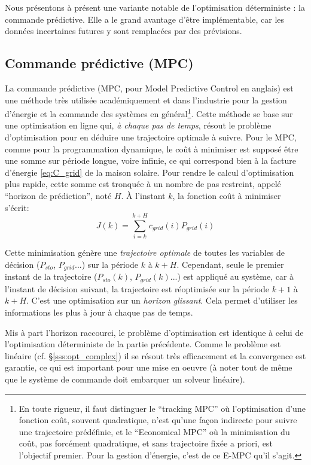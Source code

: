 \documentclass[a4paper,10pt,twocolumn]{article}
\begin{document}
Nous présentons à présent une variante notable de l'optimisation déterministe : la commande prédictive.
Elle a le grand avantage d'être implémentable, car les données incertaines futures y sont remplacées
par des prévisions.

\newpage

\subsection{Commande prédictive (MPC)}
\label{ss:mpc}

La commande prédictive (MPC, pour Model Predictive Control en anglais)
est une méthode très utilisée académiquement et dans l'industrie
pour la gestion d'énergie et la commande des systèmes en général\footnote{
  En toute rigueur, il faut distinguer le
  ``tracking MPC'' où l'optimisation d'une fonction coût, souvent quadratique,
  n'est qu'une façon indirecte pour suivre une trajectoire prédéfinie,
  et le ``Economical MPC'' où la minimisation du coût, pas forcément quadratique,
  et sans trajectoire fixée a priori, est l'objectif premier.
  Pour la gestion d'énergie, c'est de ce E-MPC qu'il s'agit.}.
Cette méthode se base sur une optimisation en ligne qui, \emph{à chaque pas de temps},
résout le problème d'optimisation pour en déduire une trajectoire optimale à suivre.
Pour le MPC, comme pour la programmation dynamique, le coût à minimiser est supposé
être une somme sur période longue, voire infinie,
ce qui correspond bien à la facture d'énergie \eqref{eq:C_grid} de la maison solaire.
Pour rendre le calcul d'optimisation plus rapide,
cette somme est tronquée à un nombre de pas restreint,
appelé ``horizon de prédiction'', noté $H$.
À l'instant $k$, la fonction coût à minimiser s'écrit:
%
\begin{equation} \label{eq:mpc_cost}
  J(k) = \sum_{i=k}^{k+H} c_{grid}(i)P_{grid}(i)
\end{equation} 

Cette minimisation génère une \emph{trajectoire optimale}
de toutes les variables de décision ($P_{sto}$, $P_{grid}$...)
sur la période $k$ à $k+H$.
Cependant, seule le premier instant de la trajectoire ($P_{sto}(k)$, $P_{grid}(k)$...)
est appliqué au système, car à l'instant de décision suivant,
la trajectoire est réoptimisée sur la période $k+1$ à $k+H$.
C'est une optimisation sur un \emph{horizon glissant}.
Cela permet d'utiliser les informations les plus à jour à chaque pas de temps.

Mis à part l'horizon raccourci, le problème d'optimisation
est identique à celui de l'optimisation déterministe de la partie précédente.
Comme le problème est linéaire (cf. §\ref{sss:opt_complex}) il se résout très efficacement
et la convergence est garantie, ce qui est important pour une mise en oeuvre
(à noter tout de même que le système de commande doit embarquer un solveur linéaire).
\end{document}
